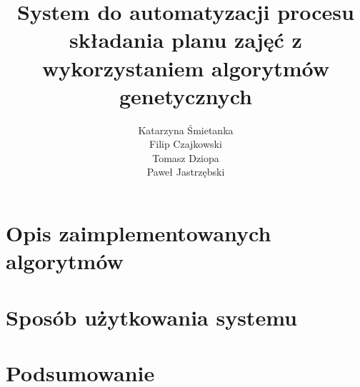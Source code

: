 \documentclass[11pt]{report}
\title{System do automatyzacji procesu składania planu zajęć z wykorzystaniem algorytmów genetycznych}
\author{
	Katarzyna Śmietanka \\
	Filip Czajkowski \\
	Tomasz Dziopa\\
	Paweł Jastrzębski
}
\begin{document}
%
%

\maketitle
\tableofcontents









\chapter{Opis zaimplementowanych algorytmów}








\chapter{Sposób użytkowania systemu}
\chapter{Podsumowanie}
\end{document}
